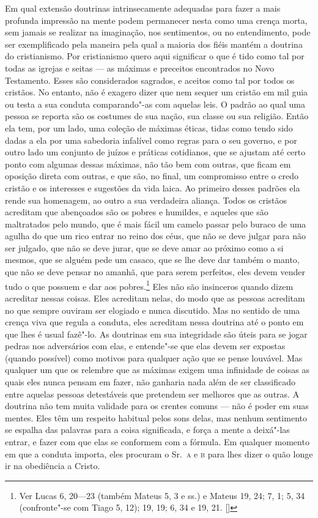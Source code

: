 Em qual extensão doutrinas intrinsecamente adequadas para fazer a mais
profunda impressão na mente podem permanecer nesta como uma crença
morta, sem jamais se realizar na imaginação, nos sentimentos, ou no
entendimento, pode ser exemplificado pela maneira pela qual a maioria
dos fiéis mantém a doutrina do cristianismo. Por cristianismo quero
aqui significar o que é tido como tal por todas as igrejas e seitas ---
as máximas e preceitos encontrados no Novo Testamento. Esses são
considerados sagrados, e aceitos como tal por todos os cristãos. No
entanto, não é exagero dizer que nem sequer um cristão em mil guia ou testa
a sua conduta comparando"-as com aquelas leis. O padrão ao qual uma
pessoa se reporta são os costumes de sua nação, sua classe ou sua
religião. Então ela tem, por um lado, uma coleção de máximas éticas,
tidas como tendo sido dadas a ela por uma sabedoria infalível como
regras para o seu governo, e por outro lado um conjunto de juízos e
práticas cotidianos, que se ajustam até certo ponto com algumas dessas
máximas, não tão bem com outras, que ficam em oposição direta com
outras, e que são, no final, um compromisso entre o credo cristão e os
interesses e sugestões da vida laica. Ao primeiro desses padrões ela
rende sua homenagem, ao outro a sua verdadeira aliança. Todos os
cristãos acreditam que abençoados são os pobres e humildes, e aqueles
que são maltratados pelo mundo, que é mais fácil um camelo passar pelo
buraco de uma agulha do que um rico entrar no reino dos céus, que não se 
deve julgar para não ser julgado, que não se deve jurar, que se deve
amar ao próximo como a si mesmos, que se alguém pede um casaco, que se lhe
deve dar também o manto, que não se deve pensar no amanhã, que
para serem perfeitos, eles devem vender tudo o que possuem e dar aos
pobres.\footnote{ Ver Lucas 6, 20---23 (também Mateus 5, 3 e ss.) e Mateus 19, 24; 7, 1;
5, 34 (confronte"-se com Tiago 5, 12); 19, 19; 6, 34 e 19, 21. []}
 Eles não são insinceros quando dizem acreditar nessas coisas. Eles
acreditam nelas, do modo que as pessoas acreditam no que sempre ouviram
ser elogiado e nunca discutido. Mas no sentido de uma crença viva que
regula a conduta, eles acreditam nessa doutrina até o ponto em que lhes
é usual fazê"-lo. As doutrinas em sua integridade são úteis para se
jogar pedras nos adversários com elas, e entende"-se que elas devem ser
expostas (quando possível) como motivos para qualquer ação que se pense
louvável. Mas qualquer um que os relembre que as máximas exigem uma
infinidade de coisas as quais eles nunca pensam em fazer, não ganharia
nada além de ser classificado entre aquelas pessoas detestáveis que
pretendem ser melhores que as outras. A doutrina não tem muita validade
para os crentes comuns  --- não é poder em suas mentes. Eles têm
um respeito habitual pelos sons delas, mas nenhum sentimento se
espalha das palavras para a coisa significada, e força a mente a
deixá"-las entrar, e fazer com que elas se conformem com a fórmula. Em
qualquer momento em que a conduta importa, eles procuram o Sr.~\textsc{a} 
e \textsc{b} para lhes dizer o quão longe ir na obediência a Cristo. 

